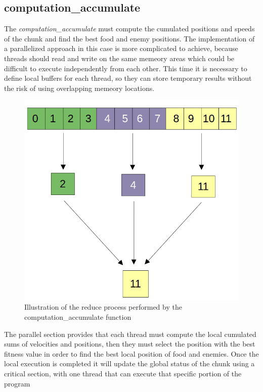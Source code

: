 \documentclass[10pt]{article}
\begin{document}
\begin{multicols}{2}
\subsection*{computation\_accumulate}

The \textit{computation\_accumulate}  must compute
the cumulated positions and speeds of the chunk and find the best food and enemy positions.
The implementation of a parallelized approach in this case  is more complicated to achieve, 
because threads should read and write on the same memeory areas which could be 
difficult to execute independently from each other. This time it is necessary to define
local buffers for each thread, so they can store temporary results without the risk of using
overlapping memeory locations. 
\begin{figure}[H]
  \includegraphics[scale=0.2]{img/reduce-example.png}
  \centering
  \caption{Illustration of the reduce process performed by the computation\_accumulate function}
\end{figure}
\noindent The parallel section provides that each thread must compute the local
cumulated sums of velocities and positions, then they must select the position with the best fitness value
in order to find the best local position of food and enemies. Once the local execution is completed
it will update the global status of the chunk using a critical section, with one thread that can execute that
specific portion of the program


\end{multicols}
\end{document}
